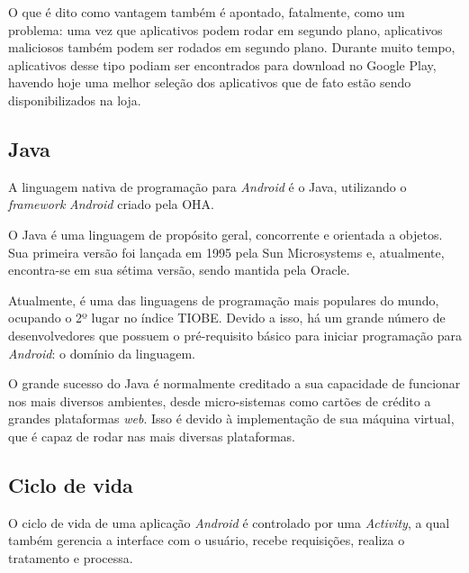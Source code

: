  	O que é dito como vantagem também é apontado, fatalmente, como um problema: uma vez que aplicativos podem rodar em segundo plano, aplicativos maliciosos também podem ser rodados em segundo plano. Durante muito tempo, aplicativos desse tipo podiam ser encontrados para download no Google Play, havendo hoje uma melhor seleção dos aplicativos que de fato estão sendo disponibilizados na loja.

 \subsection{Java} 
 	A linguagem nativa de programação para \emph{Android} é o Java, utilizando o \emph{framework} \emph{Android} criado pela \ac{OHA}.
 	
	O Java é uma linguagem de propósito geral, concorrente e orientada a objetos. Sua primeira versão foi lançada em 1995 pela Sun Microsystems e, atualmente, encontra-se em sua sétima versão, sendo mantida pela Oracle. 
	
 	Atualmente, é uma das linguagens de programação mais populares do mundo, ocupando o 2º lugar no índice TIOBE. Devido a isso, há um grande número de desenvolvedores que possuem o pré-requisito básico para iniciar programação para \emph{Android}: o domínio da linguagem.
	
 	O grande sucesso do Java é normalmente creditado a sua capacidade de funcionar nos mais diversos ambientes, desde micro-sistemas como cartões de crédito a grandes plataformas \emph{web}. Isso é devido à implementação de sua máquina virtual, que é capaz de rodar nas mais diversas plataformas. 


 \subsection{Ciclo de vida}
 	 O ciclo de vida de uma aplicação \emph{Android} é controlado por uma \emph{Activity}, a qual também gerencia a interface com o usuário, recebe requisições, realiza o tratamento e processa.
	 
